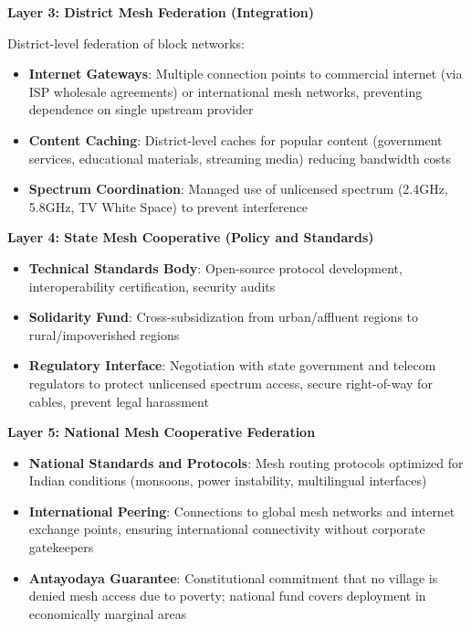 \textbf{Layer 3: District Mesh Federation (Integration)}

District-level federation of block networks:

\begin{itemize}
\tightlist
\item
  \textbf{Internet Gateways}: Multiple connection points to commercial
  internet (via ISP wholesale agreements) or international mesh
  networks, preventing dependence on single upstream provider
\item
  \textbf{Content Caching}: District-level caches for popular content
  (government services, educational materials, streaming media) reducing
  bandwidth costs
\item
  \textbf{Spectrum Coordination}: Managed use of unlicensed spectrum
  (2.4GHz, 5.8GHz, TV White Space) to prevent interference
\end{itemize}

\textbf{Layer 4: State Mesh Cooperative (Policy and Standards)}

\begin{itemize}
\tightlist
\item
  \textbf{Technical Standards Body}: Open-source protocol development,
  interoperability certification, security audits
\item
  \textbf{Solidarity Fund}: Cross-subsidization from urban/affluent
  regions to rural/impoverished regions
\item
  \textbf{Regulatory Interface}: Negotiation with state government and
  telecom regulators to protect unlicensed spectrum access, secure
  right-of-way for cables, prevent legal harassment
\end{itemize}

\textbf{Layer 5: National Mesh Cooperative Federation}

\begin{itemize}
\tightlist
\item
  \textbf{National Standards and Protocols}: Mesh routing protocols
  optimized for Indian conditions (monsoons, power instability,
  multilingual interfaces)
\item
  \textbf{International Peering}: Connections to global mesh networks
  and internet exchange points, ensuring international connectivity
  without corporate gatekeepers
\item
  \textbf{Antayodaya Guarantee}: Constitutional commitment that no
  village is denied mesh access due to poverty; national fund covers
  deployment in economically marginal areas
\end{itemize}

